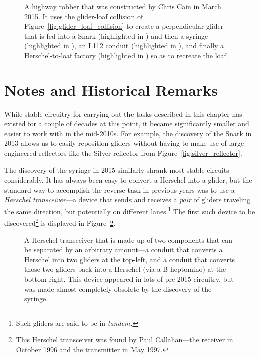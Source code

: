 \begin{figure}[!htb]
	\centering
	\caption{A highway robber that was constructed by Chris Cain in March 2015. It uses the glider-loaf collision of Figure~\ref{fig:glider_loaf_collision} to create a perpendicular glider that is fed into a Snark (highlighted in ) and then a syringe (highlighted in ), an L112 conduit (highlighted in ), and finally a Herschel-to-loaf factory (highlighted in ) so as to recreate the loaf.}
	\label{fig:highway_robber}
\end{figure}




\section{Notes and Historical Remarks}\label{sec:stable_circuits_notes}

While stable circuitry for carrying out the tasks described in this chapter has existed for a couple of decades at this point, it became significantly smaller and easier to work with in the mid-2010s. For example, the discovery of the Snark in 2013 allows us to easily reposition gliders without having to make use of large engineered reflectors like the Silver reflector from Figure~\ref{fig:silver_reflector}.

The discovery of the syringe in 2015 similarly shrank most stable circuits considerably. It has always been easy to convert a Herschel into a glider, but the standard way to accomplish the reverse task in previous years was to use a \emph{Herschel transceiver}---a device that sends and receives a \emph{pair} of gliders traveling the same direction, but potentially on different lanes.\footnote{Such gliders are said to be in \emph{tandem}.} The first such device to be discovered\footnote{This Herschel transceiver was found by Paul Callahan---the receiver in October 1996 and the transmitter in May 1997.} is displayed in Figure~\ref{fig:herschel_transceiver}.

\begin{figure}[!htb]
	\centering
	\caption{A Herschel transceiver that is made up of two components that can be separated by an arbitrary amount---a conduit that converts a Herschel into two gliders at the top-left, and a conduit that converts those two gliders back into a Herschel (via a B-heptomino) at the bottom-right. This device appeared in lots of pre-2015 circuitry, but was made almost completely obsolete by the discovery of the syringe.}
	\label{fig:herschel_transceiver}
\end{figure}

